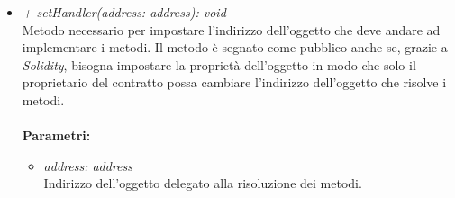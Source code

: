 \begin{itemize}
\begin{itemize}
\begin{itemize}
		\end{itemize}
		\item \textit{+ setHandler(address: address): void}\\
		Metodo necessario per impostare l'indirizzo dell'oggetto che deve andare ad implementare i metodi. Il metodo è segnato come pubblico anche se, grazie a \textit{Solidity}, bisogna impostare la proprietà dell'oggetto in modo che solo il proprietario del contratto possa cambiare l'indirizzo dell'oggetto che risolve i metodi.\\\\
		\textbf{Parametri:}
		\begin{itemize}
			\item \textit{address: address}\\
			Indirizzo dell'oggetto delegato alla risoluzione dei metodi.
		\end{itemize}		
	\end{itemize}
\end{itemize}
